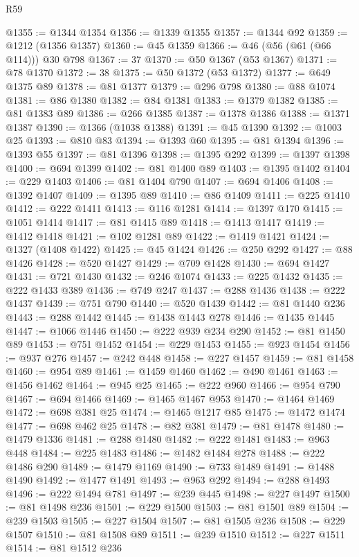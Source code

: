 \begin{lexlean}{R59}
\begin{coremodule}
@1355 := @1344 @1354
@1356 := @1339 @1355
@1357 := @1344 @92
@1359 := @1212 (@1356 @1357)
@1360 := @45 @1359
@1366 := @46 (@56 (@61 (@66 @114))) @30 @798
@1367 := 37
@1370 := @50 @1367 (@53 @1367)
@1371 := @78 @1370
@1372 := 38
@1375 := @50 @1372 (@53 @1372)
@1377 := @649 @1375 @89
@1378 := @81 @1377
@1379 := @296 @798
@1380 := @88 @1074
@1381 := @86 @1380
@1382 := @84 @1381
@1383 := @1379 @1382
@1385 := @81 @1383 @89
@1386 := @266 @1385
@1387 := @1378 @1386
@1388 := @1371 @1387
@1390 := @1366 (@1038 @1388)
@1391 := @45 @1390
@1392 := @1003 @25
@1393 := @810 @83
@1394 := @1393 @60
@1395 := @81 @1394
@1396 := @1393 @55
@1397 := @81 @1396
@1398 := @1395 @292
@1399 := @1397 @1398
@1400 := @694 @1399
@1402 := @81 @1400 @89
@1403 := @1395 @1402
@1404 := @229 @1403
@1406 := @81 @1404 @790
@1407 := @694 @1406
@1408 := @1392 @1407
@1409 := @1395 @89
@1410 := @86 @1409
@1411 := @225 @1410
@1412 := @222 @1411
@1413 := @116 @1281
@1414 := @1397 @170
@1415 := @1051 @1414
@1417 := @81 @1415 @89
@1418 := @1413 @1417
@1419 := @1412 @1418
@1421 := @102 @1281 @89
@1422 := @1419 @1421
@1424 := @1327 (@1408 @1422)
@1425 := @45 @1424
@1426 := @250 @292
@1427 := @88 @1426
@1428 := @520 @1427
@1429 := @709 @1428
@1430 := @694 @1427
@1431 := @721 @1430
@1432 := @246 @1074
@1433 := @225 @1432
@1435 := @222 @1433 @389
@1436 := @749 @247
@1437 := @288 @1436
@1438 := @222 @1437
@1439 := @751 @790
@1440 := @520 @1439
@1442 := @81 @1440 @236
@1443 := @288 @1442
@1445 := @1438 @1443 @278
@1446 := @1435 @1445
@1447 := @1066 @1446
@1450 := @222 @939 @234 @290
@1452 := @81 @1450 @89
@1453 := @751 @1452
@1454 := @229 @1453
@1455 := @923 @1454
@1456 := @937 @276
@1457 := @242 @448
@1458 := @227 @1457
@1459 := @81 @1458
@1460 := @954 @89
@1461 := @1459 @1460
@1462 := @490 @1461
@1463 := @1456 @1462
@1464 := @945 @25
@1465 := @222 @960
@1466 := @954 @790
@1467 := @694 @1466
@1469 := @1465 @1467 @953
@1470 := @1464 @1469
@1472 := @698 @381 @25
@1474 := @1465 @1217 @85
@1475 := @1472 @1474
@1477 := @698 @462 @25
@1478 := @82 @381
@1479 := @81 @1478
@1480 := @1479 @1336
@1481 := @288 @1480
@1482 := @222 @1481
@1483 := @963 @448
@1484 := @225 @1483
@1486 := @1482 @1484 @278
@1488 := @222 @1486 @290
@1489 := @1479 @1169
@1490 := @733 @1489
@1491 := @1488 @1490
@1492 := @1477 @1491
@1493 := @963 @292
@1494 := @288 @1493
@1496 := @222 @1494 @781
@1497 := @239 @445
@1498 := @227 @1497
@1500 := @81 @1498 @236
@1501 := @229 @1500
@1503 := @81 @1501 @89
@1504 := @239 @1503
@1505 := @227 @1504
@1507 := @81 @1505 @236
@1508 := @229 @1507
@1510 := @81 @1508 @89
@1511 := @239 @1510
@1512 := @227 @1511
@1514 := @81 @1512 @236

\end{coremodule}
\end{lexlean}
